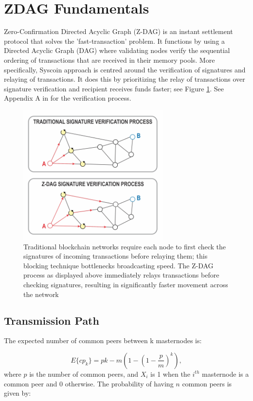 \documentclass[peerreview]{ieeesyscoin}
\begin{document}
\section{ZDAG Fundamentals}

Zero-Confirmation Directed Acyclic Graph (Z-DAG) is an instant settlement protocol that solves the 'fast-transaction' problem. It functions by using a Directed Acyclic Graph (DAG) where validating nodes verify the sequential ordering of transactions that are received in their memory pools. More specifically, Syscoin approach is centred around the verification of signatures and relaying of transactions. It does this by prioritizing the relay of transactions over signature verification and recipient receives funds faster; see Figure \ref{fig:dag_tx}. See Appendix A in \cite{Sidb18} for the verification process.

\begin{figure}[h!]
\includegraphics[width=3in]{img/dag_tx.png}
\caption{Traditional blockchain networks require each node to first check the signatures of incoming transactions before relaying them; this blocking technique bottlenecks broadcasting speed. The Z-DAG process as displayed above immediately relays transactions before checking signatures, resulting in significantly faster movement across the network} 
\label{fig:dag_tx}
\end{figure} 


\subsection{Transmission Path}

The expected number of common peers between k masternodes is:

\begin{equation}
E\{cp_{k}\} = pk -m \left(1 - \left(1 - \frac{p}{m}\right)^{k}\right),
\end{equation}
where $p$ is the number of common peers, and $X_{i}$ is 1 when the $i^{th}$ masternode is a common peer and 0 otherwise. The probability of having $n$ common peers is given by: 
\end{document}
